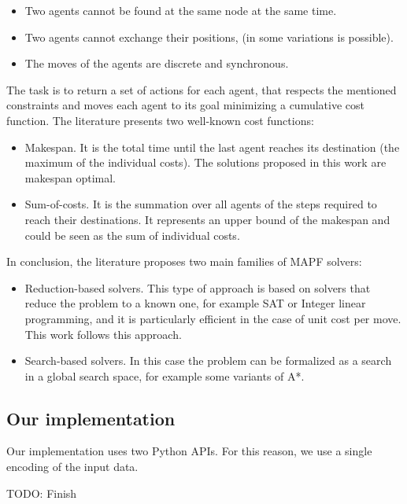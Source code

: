 \documentclass[12pt, a4paper, hidelinks]{article}
\numberwithin{equation}{section}
\begin{document}
\begin{itemize} 
\item Two agents cannot be found at the same node at the same time.
\item Two agents cannot exchange their positions, (in some variations is possible).
\item The moves of the agents are discrete and synchronous.
\end{itemize}

The task is to return a set of actions for each agent, that respects the mentioned constraints and moves each agent to its goal minimizing a cumulative cost function. 
The literature presents two well-known cost functions:

\begin{itemize}
\item Makespan. 
It is the total time until the last agent reaches its destination (the maximum of the individual costs).
The solutions proposed in this work are makespan optimal.
\item Sum-of-costs.
It is the summation over all agents of the steps required to reach their destinations. 
It represents an upper bound of the makespan and could be seen as the sum of individual costs.
\end{itemize}

In conclusion, the literature proposes two main families of MAPF solvers:

\begin{itemize}
\item Reduction-based solvers.
This type of approach is based on solvers that reduce the problem to a known one, for example SAT or Integer linear programming, and it is particularly efficient in the case of unit cost per move.
This work follows this approach.
\item Search-based solvers.
In this case the problem can be formalized as a search in a global search space, for example some variants of A*.
\end{itemize}

\subsection*{Our implementation}
Our implementation uses two Python APIs.
For this reason, we use a single encoding of the input data.

TODO: Finish
\end{document}
